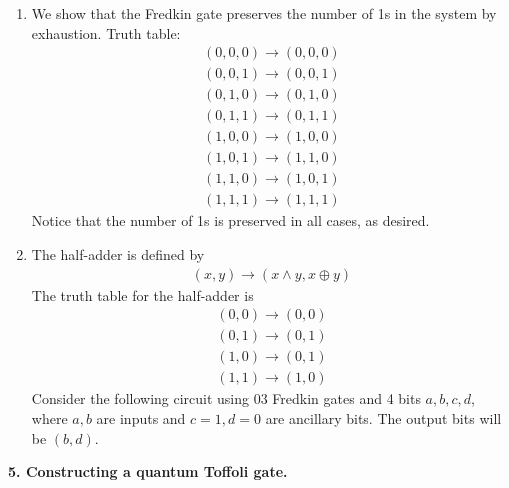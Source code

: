 \documentclass{article}
\theoremstyle{definition}
\begin{document}
\begin{enumerate}[label=(\alph*)]
	\item We show that the Fredkin gate preserves the number of 1s in the system by exhaustion. Truth table:
	\begin{align*}
		(0,0,0) \to (0,0,0)\\
		(0,0,1) \to (0,0,1)\\
		(0,1,0) \to (0,1,0)\\
		(0,1,1) \to (0,1,1)\\
		(1,0,0) \to (1,0,0)\\
		(1,0,1) \to (1,1,0)\\
		(1,1,0) \to (1,0,1)\\
		(1,1,1) \to (1,1,1)
	\end{align*}
	Notice that the number of 1s is preserved in all cases, as desired. 
	
	\item The half-adder is defined by 
	\begin{align*}
		(x,y) \to (x \land y, x \oplus y)
	\end{align*}
	The truth table for the half-adder is 
	\begin{align*}
		(0,0) \to (0,0) \\
		(0,1) \to (0,1) \\
		(1,0) \to (0,1) \\
		(1,1) \to (1,0) 
	\end{align*}
	Consider the following circuit using 03 Fredkin gates and 4 bits $a,b,c,d$, where $a,b$ are inputs and $c=1,d=0$ are ancillary bits. The output bits will be $(b,d)$. 
	
	
	
	
\end{enumerate}



\noindent \textbf{5. Constructing a quantum Toffoli gate.}
\end{document}
